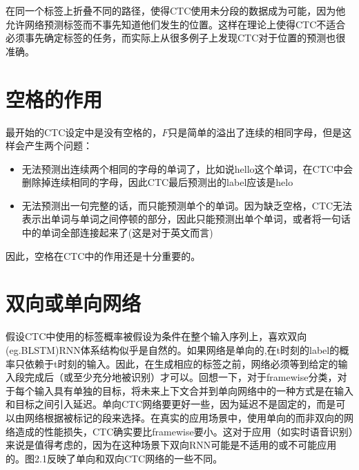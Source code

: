 \documentclass[]{book}
\theoremstyle{definition}
\theoremstyle{definition}
\theoremstyle{definition}
\theoremstyle{remark}
\begin{document}
在同一个标签上折叠不同的路径，使得CTC使用未分段的数据成为可能，因为他允许网络预测标签而不事先知道他们发生的位置。这样在理论上使得CTC不适合必须事先确定标签的任务，而实际上从很多例子上发现CTC对于位置的预测也很准确。

\section{空格的作用}

最开始的CTC设定中是没有空格的，\(F\)只是简单的溢出了连续的相同字母，但是这样会产生两个问题：

\begin{itemize}
\item
  无法预测出连续两个相同的字母的单词了，比如说hello这个单词，在CTC中会删除掉连续相同的字母，因此CTC最后预测出的label应该是helo
\item
  无法预测出一句完整的话，而只能预测单个的单词。因为缺乏空格，CTC无法表示出单词与单词之间停顿的部分，因此只能预测出单个单词，或者将一句话中的单词全部连接起来了(这是对于英文而言)
\end{itemize}

因此，空格在CTC中的作用还是十分重要的。

\section{双向或单向网络}

假设CTC中使用的标签概率被假设为条件在整个输入序列上，喜欢双向(eg.BLSTM)RNN体系结构似乎是自然的。如果网络是单向的,在t时刻的label的概率只依赖于t时刻的输入。因此，在生成相应的标签之前，网络必须等到给定的输入段完成后（或至少充分地被识别）才可以。回想一下，对于framewise分类，对于每个输入具有单独的目标，将未来上下文合并到单向网络中的一种方式是在输入和目标之间引入延迟。单向CTC网络要更好一些，因为延迟不是固定的，而是可以由网络根据被标记的段来选择。在真实的应用场景中，使用单向的而非双向的网络造成的性能损失，CTC确实要比framewise要小。这对于应用（如实时语音识别）来说是值得考虑的，因为在这种场景下双向RNN可能是不适用的或不可能应用的。图2.1反映了单向和双向CTC网络的一些不同。
\end{document}
